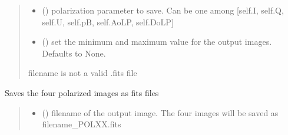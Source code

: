 \documentclass[letterpaper,10pt,english]{sphinxmanual}
\begin{document}
\begin{fulllineitems}
\begin{fulllineitems}
\begin{quote}
\begin{description}
\begin{itemize}
\item {} 
\sphinxAtStartPar
{} ({\hyperref[\detokenize{micropolarray:micropolarray.micropol_image.PolParam}]{}}) \textendash{} polarization parameter to save. Can be one among {[}self.I, self.Q, self.U, self.pB, self.AoLP, self.DoLP{]}

\item {} 
\sphinxAtStartPar
{} (\sphinxstyleliteralemphasis{\sphinxupquote{{[}}}\sphinxstyleliteralemphasis{\sphinxupquote{, }}\sphinxstyleliteralemphasis{\sphinxupquote{{]}}}\sphinxstyleliteralemphasis{\sphinxupquote{, }}) \textendash{} set the minimum and maximum value for the output images. Defaults to None.

\end{itemize}

\sphinxAtStartPar
{} \textendash{} filename is not a valid .fits file

\end{description}\end{quote}

\end{fulllineitems}


\begin{fulllineitems}
\label{\detokenize{micropolarray:micropolarray.micropol_image.MicropolImage.save_single_pol_images}}
\pysigstartsignatures
{}
\pysigstopsignatures
\sphinxAtStartPar
Saves the four polarized images as fits files
\begin{quote}\begin{description}
\begin{itemize}
\item {} 
\sphinxAtStartPar
{} () \textendash{} filename of the output image. The four images will be saved as filename\_POLXX.fits


\end{itemize}
\end{description}
\end{quote}
\end{fulllineitems}
\end{fulllineitems}
\end{document}
